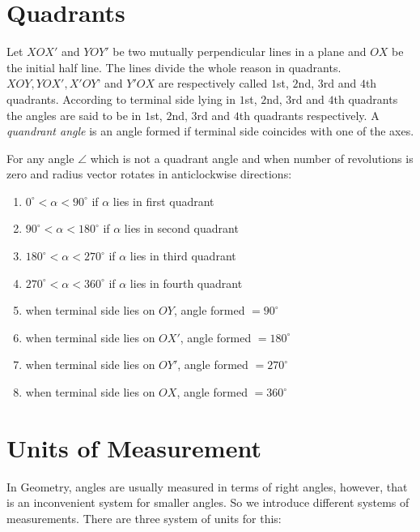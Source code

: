 \section{Quadrants}
\begin{center}
\end{center}

Let $XOX'$ and $YOY'$ be two mutually perpendicular lines in a plane and $OX$ be the initial half line. The lines divide the whole
reason in quadrants. $XOY, YOX', X′OY$' and $Y′OX$ are respectively called $1$st, $2$nd, $3$rd and $4$th quadrants. According to
terminal side lying in $1$st, $2$nd, $3$rd and $4$th quadrants the angles are said to be in $1$st, $2$nd, $3$rd and $4$th quadrants
respectively. A {\it quandrant angle} is an angle formed if terminal side coincides with one of the axes.

For any angle $\angle$ which is not a quadrant angle and when number of revolutions is zero and radius vector rotates in
anticlockwise directions:

\begin{enumerate}
\item $0^\circ< \alpha < 90^\circ$ if $\alpha$ lies in first quadrant
\item $90^\circ< \alpha < 180^\circ$ if $\alpha$ lies in second quadrant
\item $180^\circ< \alpha < 270^\circ$ if $\alpha$ lies in third quadrant
\item $270^\circ< \alpha < 360^\circ$ if $\alpha$ lies in fourth quadrant
\item when terminal side lies on $OY$, angle formed $=90^\circ$
\item when terminal side lies on $OX'$, angle formed $=180^\circ$
\item when terminal side lies on $OY'$, angle formed $=270^\circ$
\item when terminal side lies on $OX$, angle formed $=360^\circ$
\end{enumerate}

\section{Units of Measurement}
In Geometry, angles are usually measured in terms of right angles, however, that is an inconvenient system for smaller angles. So
we introduce different systems of measurements. There are three system of units for this:

